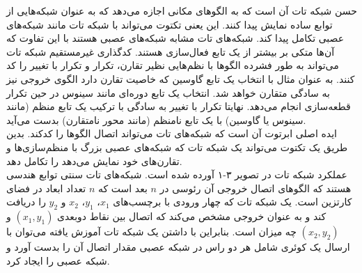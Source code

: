حسن شبکه تات آن است که به الگوهای مکانی اجازه می‌دهد که به عنوان شبکه‌هایی از توابع ساده نمایش پیدا کنند. این یعنی تکتوت می‌تواند با شبکه تات مانند شبکه‌های عصبی تکامل پیدا کند. شبکه‌های تات مشابه شبکه‌های عصبی هستند با این تفاوت که آن‌ها متکی بر بیشتر از یک تابع فعال‌سازی هستند.
کدگذاری غیرمستقیم شبکه تات می‌تواند به طور فشرده الگوها با نظم‌هایی نظیر تقارن، تکرار و تکرار با تغییر را کد کنند. به عنوان مثال با انتخاب یک تابع گاوسین که خاصیت تقارن دارد الگوی خروجی نیز به سادگی متقارن خواهد شد. انتخاب یک تابع دوره‌ای مانند سینوس در حین تکرار قطعه‌سازی انجام می‌دهد. نهایتا تکرار با تغییر به سادگی با ترکیب یک تابع منظم (مانند سینوس یا گاوسین) با یک تابع نامنظم (مانند محور  نامتقارن) بدست می‌آید.\cite{merrild2018hyperntm} 
\\

ایده اصلی ابرتوت آن است که شبکه‌های تات می‌تواند اتصال الگوها را کدکند. بدین طریق یک تکتوت می‌تواند یک شبکه تات که شبکه‌های عصبی بزرگ با منظم‌سازی‌ها و تقارن‌های خود نمایش می‌دهد را تکامل دهد.\cite{merrild2018hyperntm}
\\

عملکرد شبکه تات در تصویر ۳-۱ آورده شده است. شبکه‌های تات سنتی توابع هندسی هستند که الگوهای اتصال خروجی آن رئوسی در $n$ بعد است که $n$ تعداد ابعاد در فضای کارتزین است. یک شبکه تات که چهار ورودی با برچسب‌های $x_1$، $y_1$، $x_2$ و $y_2$ را دریافت کند و به عنوان خروجی مشخص می‌کند که اتصال بین نقاط دوبعدی $(x_1, y_1)$ و $(x_2, y_2)$ چه میزان است. بنابراین با داشتن یک شبکه تات آموزش یافته می‌توان با ارسال یک کوئری شامل هر دو راس در شبکه عصبی مقدار اتصال آن را بدست آورد و شبکه عصبی را ایجاد کرد.\cite{merrild2018hyperntm}

